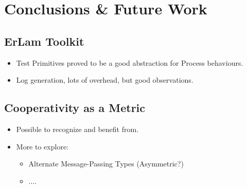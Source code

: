 \section{Conclusions \& Future Work}

\subsection{ErLam Toolkit}

\begin{slide}
    \begin{itemize}
        \item Test Primitives proved to be a good abstraction for 
            Process behaviours.
        \item Log generation, lots of overhead, but good observations.
    \end{itemize}

\end{slide}

\subsection{Cooperativity as a Metric}

\begin{slide}

    \begin{itemize}
        \item Possible to recognize and benefit from.
        \item More to explore:
            \begin{itemize}
                \item Alternate Message-Passing Types (Asymmetric?)
                \item ....
            \end{itemize}
    
    \end{itemize}

\end{slide}

